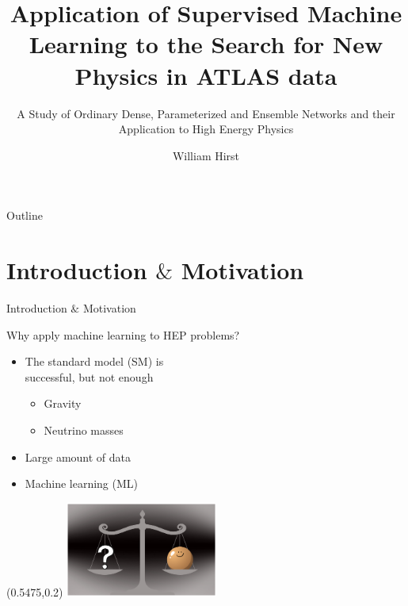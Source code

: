 \documentclass[UKenglish]{beamer}
\author{William Hirst}
\title[Supervised Learning in HEP]{Application of Supervised Machine Learning to the Search for New Physics in ATLAS data}
\subtitle{A Study of Ordinary Dense, Parameterized and Ensemble Networks and their Application to High Energy Physics}
\begin{document}
\begin{frame}{Outline}
    \tableofcontents
\end{frame}


\section{Introduction $\&$ Motivation}
\begin{frame}{Introduction $\&$ Motivation}
    \tableofcontents[currentsection]
\end{frame}

\begin{frame}{Why apply machine learning to HEP problems?}
    \begin{itemize}
        \item The standard model (SM) is\\ successful, but not enough
        \begin{itemize}
            \item Gravity
            \item Neutrino masses 
        \end{itemize}
        \item Large amount of data
        \item Machine learning (ML)
    \end{itemize}
    \begin{textblock}{1}(0.5475,0.2)
        \includegraphics[width=0.375\textwidth]{figures/neutrino}
    \end{textblock}
\end{frame}
\end{document}
